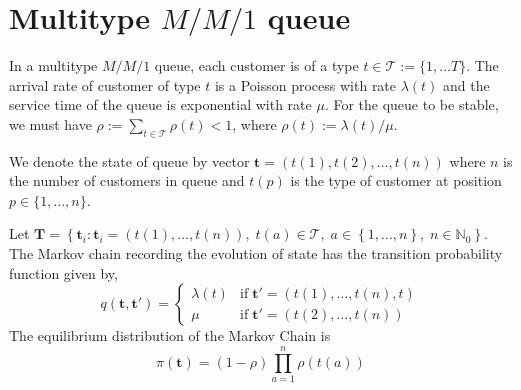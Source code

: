 \section{Multitype $M/M/1$ queue}
In a multitype $M/M/1$ queue, each customer is of a type $t \in \mathcal{T} := \{1,\ldots T\}$. The arrival rate of customer of type $t$ is a Poisson process with rate $\lambda(t)$ and the service time of the queue is exponential with rate $\mu$. For the queue to be stable, we must have $\rho := \sum_{t\in\mathcal{T}} \rho(t) < 1$, where $\rho(t) := \lambda(t)/\mu$.

We denote the state of queue by vector
$\mathbf{t}=\left(t(1),t(2),\ldots,t(n)\right)$ where $n$ is the number of customers in queue and $t(p)$ is the type of customer at position $p \in \{1,\ldots ,n\}$.

Let $\mathbf{T} = \left\{\mathbf{t}_i : \mathbf{t}_i = \left(t(1),\ldots,t(n)\right), \; t(a)\in\mathcal{T}, \;a\in\left\{1,\ldots,n\right\}, \; n \in \mathbb{N}_0\right\}$. The Markov chain recording the evolution of state has the transition probability
function given by,
\[
q(\mathbf{t},\mathbf{t}') = \begin{cases}
\lambda(t) &\text{if} \; \mathbf{t}'=\left(t(1),\ldots,t(n),t\right)\\
\mu        &\text{if} \; \mathbf{t}'=\left(t(2),\ldots,t(n)\right) 
\end{cases}
\]
The equilibrium distribution of the Markov Chain is
\[
\pi(\mathbf{t}) = (1-\rho)\prod_{a=1}^{n}\rho\left(t(a)\right)
\]








